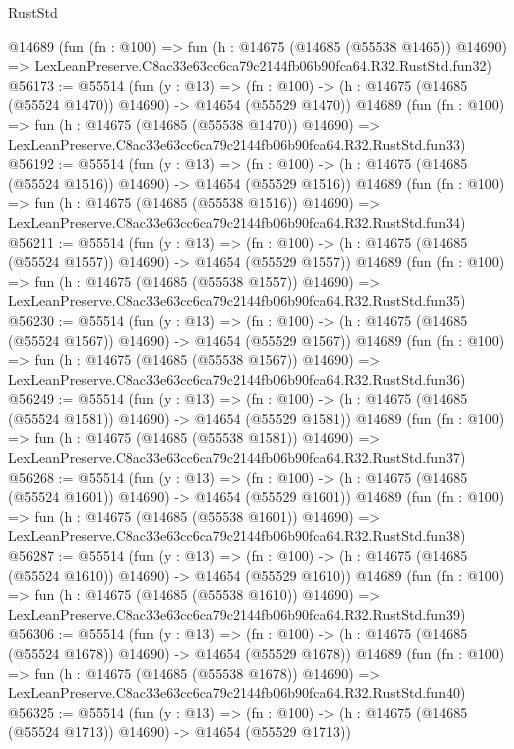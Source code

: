 \begin{lexlean}{RustStd}
\begin{coremodule}
    @14689
    (fun (fn : @100) =>
    fun (h : @14675 (@14685 (@55538 @1465)) @14690) =>
    LexLeanPreserve.C8ac33e63cc6ca79c2144fb06b90fca64.R32.RustStd.fun32)
@56173 := @55514
    (fun (y : @13) =>
    (fn : @100) -> (h : @14675 (@14685 (@55524 @1470)) @14690) -> @14654 (@55529 @1470))
    @14689
    (fun (fn : @100) =>
    fun (h : @14675 (@14685 (@55538 @1470)) @14690) =>
    LexLeanPreserve.C8ac33e63cc6ca79c2144fb06b90fca64.R32.RustStd.fun33)
@56192 := @55514
    (fun (y : @13) =>
    (fn : @100) -> (h : @14675 (@14685 (@55524 @1516)) @14690) -> @14654 (@55529 @1516))
    @14689
    (fun (fn : @100) =>
    fun (h : @14675 (@14685 (@55538 @1516)) @14690) =>
    LexLeanPreserve.C8ac33e63cc6ca79c2144fb06b90fca64.R32.RustStd.fun34)
@56211 := @55514
    (fun (y : @13) =>
    (fn : @100) -> (h : @14675 (@14685 (@55524 @1557)) @14690) -> @14654 (@55529 @1557))
    @14689
    (fun (fn : @100) =>
    fun (h : @14675 (@14685 (@55538 @1557)) @14690) =>
    LexLeanPreserve.C8ac33e63cc6ca79c2144fb06b90fca64.R32.RustStd.fun35)
@56230 := @55514
    (fun (y : @13) =>
    (fn : @100) -> (h : @14675 (@14685 (@55524 @1567)) @14690) -> @14654 (@55529 @1567))
    @14689
    (fun (fn : @100) =>
    fun (h : @14675 (@14685 (@55538 @1567)) @14690) =>
    LexLeanPreserve.C8ac33e63cc6ca79c2144fb06b90fca64.R32.RustStd.fun36)
@56249 := @55514
    (fun (y : @13) =>
    (fn : @100) -> (h : @14675 (@14685 (@55524 @1581)) @14690) -> @14654 (@55529 @1581))
    @14689
    (fun (fn : @100) =>
    fun (h : @14675 (@14685 (@55538 @1581)) @14690) =>
    LexLeanPreserve.C8ac33e63cc6ca79c2144fb06b90fca64.R32.RustStd.fun37)
@56268 := @55514
    (fun (y : @13) =>
    (fn : @100) -> (h : @14675 (@14685 (@55524 @1601)) @14690) -> @14654 (@55529 @1601))
    @14689
    (fun (fn : @100) =>
    fun (h : @14675 (@14685 (@55538 @1601)) @14690) =>
    LexLeanPreserve.C8ac33e63cc6ca79c2144fb06b90fca64.R32.RustStd.fun38)
@56287 := @55514
    (fun (y : @13) =>
    (fn : @100) -> (h : @14675 (@14685 (@55524 @1610)) @14690) -> @14654 (@55529 @1610))
    @14689
    (fun (fn : @100) =>
    fun (h : @14675 (@14685 (@55538 @1610)) @14690) =>
    LexLeanPreserve.C8ac33e63cc6ca79c2144fb06b90fca64.R32.RustStd.fun39)
@56306 := @55514
    (fun (y : @13) =>
    (fn : @100) -> (h : @14675 (@14685 (@55524 @1678)) @14690) -> @14654 (@55529 @1678))
    @14689
    (fun (fn : @100) =>
    fun (h : @14675 (@14685 (@55538 @1678)) @14690) =>
    LexLeanPreserve.C8ac33e63cc6ca79c2144fb06b90fca64.R32.RustStd.fun40)
@56325 := @55514
    (fun (y : @13) =>
    (fn : @100) -> (h : @14675 (@14685 (@55524 @1713)) @14690) -> @14654 (@55529 @1713))

\end{coremodule}
\end{lexlean}
